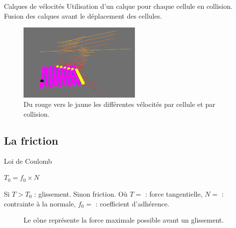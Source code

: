 \documentclass{beamer}
\begin{document}
\begin{frame}{Calques de vélocités}
  Utilisation d'un calque pour chaque cellule en collision. Fusion des calques avant le déplacement des cellules.
  \begin{figure}
    \begin{center}
      \includegraphics[width=6cm]{Images/calque.png}
    \end{center}
    \caption{Du rouge vers le jaune les différentes vélocités par cellule et par collision.}
  \end{figure}
\end{frame}

\subsection{La friction}
\begin{frame}{Loi de Coulomb}
  \begin{center}
    $T_0 = f_0 \times N$
  \end{center}
  Si $T > T_0$ : glissement. Sinon friction. \smallbreak
  Où $T = $ : force tangentielle, $N = $ : contrainte à la normale, $f_0 = $ : coefficient d'adhérence.
  \begin{figure}
    \begin{center}
    \end{center}
    \caption{Le cône représente la force maximale possible avant un glissement.}
  \end{figure}
\end{frame}
\end{document}

